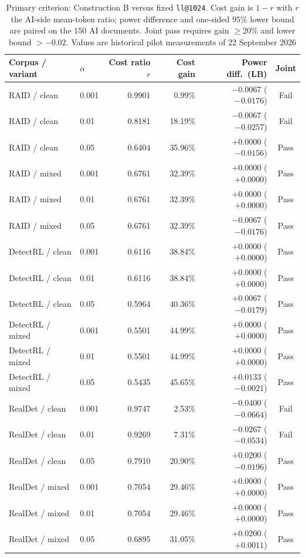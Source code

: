 \documentclass[pdflatex,sn-mathphys-num]{sn-jnl}
\begin{document}
\begin{table}[t]
\caption{Primary criterion: Construction B versus fixed \texttt{ll@1024}. Cost gain is \(1-r\) with \(r\) the AI-side mean-token ratio; power difference and one-sided \(95\%\) lower bound are paired on the \(150\) AI documents. Joint pass requires gain \(\ge 20\%\) and lower bound \(>-0.02\). Values are historical pilot measurements of 22 September 2026}
\label{tab:results-primary}
\small
\begin{tabularx}{\textwidth}{@{}llrrrc@{}}
\toprule
Corpus / variant & \(\alpha\) & Cost ratio \(r\) & Cost gain & Power diff.\ (LB) & Joint \\
\midrule
RAID / clean   & 0.001 & 0.9901 &  0.99\% & $-0.0067$ ($-0.0176$) & Fail \\
RAID / clean   & 0.01  & 0.8181 & 18.19\% & $-0.0067$ ($-0.0257$) & Fail \\
RAID / clean   & 0.05  & 0.6404 & 35.96\% & $+0.0000$ ($-0.0156$) & Pass \\
RAID / mixed   & 0.001 & 0.6761 & 32.39\% & $+0.0000$ ($+0.0000$) & Pass \\
RAID / mixed   & 0.01  & 0.6761 & 32.39\% & $+0.0000$ ($+0.0000$) & Pass \\
RAID / mixed   & 0.05  & 0.6761 & 32.39\% & $-0.0067$ ($-0.0176$) & Pass \\
DetectRL / clean & 0.001 & 0.6116 & 38.84\% & $+0.0000$ ($+0.0000$) & Pass \\
DetectRL / clean & 0.01  & 0.6116 & 38.84\% & $+0.0000$ ($+0.0000$) & Pass \\
DetectRL / clean & 0.05  & 0.5964 & 40.36\% & $+0.0067$ ($-0.0179$) & Pass \\
DetectRL / mixed & 0.001 & 0.5501 & 44.99\% & $+0.0000$ ($+0.0000$) & Pass \\
DetectRL / mixed & 0.01  & 0.5501 & 44.99\% & $+0.0000$ ($+0.0000$) & Pass \\
DetectRL / mixed & 0.05  & 0.5435 & 45.65\% & $+0.0133$ ($-0.0021$) & Pass \\
RealDet / clean & 0.001 & 0.9747 &  2.53\% & $-0.0400$ ($-0.0664$) & Fail \\
RealDet / clean & 0.01  & 0.9269 &  7.31\% & $-0.0267$ ($-0.0534$) & Fail \\
RealDet / clean & 0.05  & 0.7910 & 20.90\% & $+0.0200$ ($-0.0196$) & Pass \\
RealDet / mixed & 0.001 & 0.7054 & 29.46\% & $+0.0000$ ($+0.0000$) & Pass \\
RealDet / mixed & 0.01  & 0.7054 & 29.46\% & $+0.0000$ ($+0.0000$) & Pass \\
RealDet / mixed & 0.05  & 0.6895 & 31.05\% & $+0.0200$ ($+0.0011$) & Pass \\
\bottomrule
\end{tabularx}
\end{table}
\end{document}
